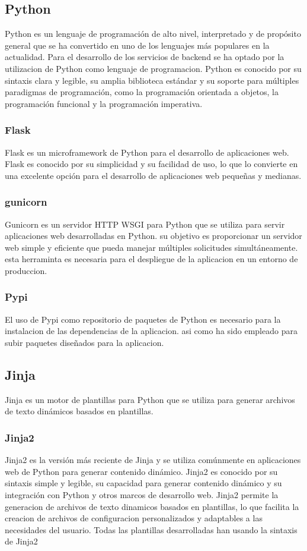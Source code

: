 \documentclass[12pt, a4paper, twoside]{article}
\begin{document}
\subsection{Python}
\cite{python}
Python es un lenguaje de programación de alto nivel, interpretado y de propósito general que se ha convertido en uno de los lenguajes más populares en la actualidad.
Para el desarrollo de los servicios de backend se ha optado por la utilizacion de Python como lenguaje de programacion.
Python es conocido por su sintaxis clara y legible, su amplia biblioteca estándar y su soporte para múltiples paradigmas de programación, como la programación orientada a objetos, la programación funcional y la programación imperativa.
\subsubsection{Flask}
\cite{flask}
Flask es un microframework de Python para el desarrollo de aplicaciones web.
Flask es conocido por su simplicidad y su facilidad de uso, lo que lo convierte en una excelente opción para el desarrollo de aplicaciones web pequeñas y medianas.
\subsubsection{gunicorn}
\cite{gunicorn}
Gunicorn es un servidor HTTP WSGI para Python que se utiliza para servir aplicaciones web desarrolladas en Python. su objetivo es proporcionar un servidor web simple y eficiente que pueda manejar múltiples solicitudes simultáneamente.
esta herraminta es necesaria para el despliegue de la aplicacion en un entorno de produccion.
\subsubsection{Pypi}
\cite{pypi}
El uso de Pypi como repositorio de paquetes de Python es necesario para la instalacion de las dependencias de la aplicacion.
asi como ha sido empleado para subir paquetes diseñados para la aplicacion.

\subsection{Jinja}
\cite{jinja}
Jinja es un motor de plantillas para Python que se utiliza para generar archivos de texto dinámicos basados en plantillas. 

\subsubsection{Jinja2}
Jinja2 es la versión más reciente de Jinja y se utiliza comúnmente en aplicaciones web de Python para generar contenido dinámico.
Jinja2 es conocido por su sintaxis simple y legible, su capacidad para generar contenido dinámico y su integración con Python y otros marcos de desarrollo web.
Jinja2 permite la generacion de archivos de texto dinamicos basados en plantillas, lo que facilita la creacion de archivos de configuracion personalizados y adaptables a las necesidades del usuario.
Todas las plantillas desarrolladas han usando la sintaxis de Jinja2
\end{document}
